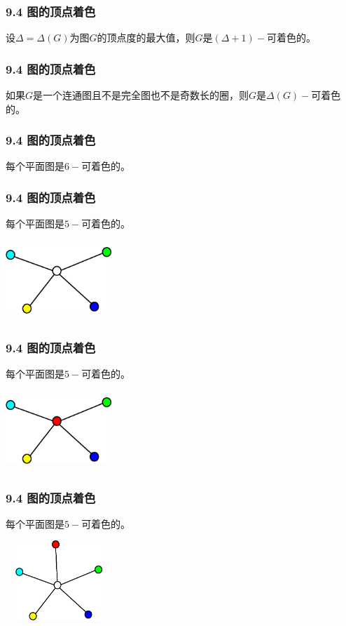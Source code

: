 \documentclass{beamer}
\begin{document}
\begin{CJK}{UTF8}{gbsn}
\begin{frame}
  \frametitle{9.4 图的顶点着色}
  \begin{theorem9.4.2}
    设$\Delta = \Delta (G)$为图$G$的顶点度的最大值，则$G$是$(\Delta+1)-$可着色的。
  \end{theorem9.4.2}
\end{frame}
\begin{frame}
  \frametitle{9.4 图的顶点着色}
  \begin{theorem9.4.3}
    如果$G$是一个连通图且不是完全图也不是奇数长的圈，则$G$是$\Delta(G)-$可着色的。
  \end{theorem9.4.3}
\end{frame}
\begin{frame}
  \frametitle{9.4 图的顶点着色}
  \begin{theorem9.4.4}
    每个平面图是$6-$可着色的。
  \end{theorem9.4.4}
\end{frame}
\begin{frame}
  \frametitle{9.4 图的顶点着色}
  \begin{theorem9.4.5}
    每个平面图是$5-$可着色的。
  \end{theorem9.4.5}
\vspace{1cm}
\includegraphics[width=4cm,height=3cm]{color52}
\end{frame}
\begin{frame}
  \frametitle{9.4 图的顶点着色}
  \begin{theorem9.4.5}
    每个平面图是$5-$可着色的。
  \end{theorem9.4.5}
\vspace{1cm}
\includegraphics[width=4cm,height=3cm]{color53}
\end{frame}

\begin{frame}
  \frametitle{9.4 图的顶点着色}
  \begin{theorem9.4.5}
    每个平面图是$5-$可着色的。
  \end{theorem9.4.5}
\vspace{1cm}
\includegraphics[width=4cm,height=3cm]{color51}
\end{frame}


\end{CJK}
\end{document}
